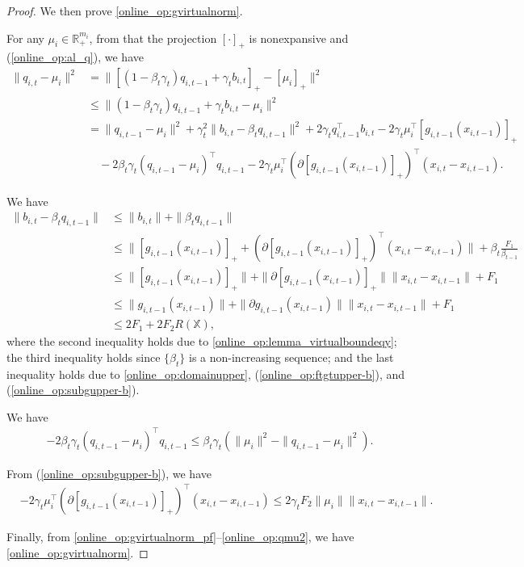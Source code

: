 \documentclass[12pt,draftcls,onecolumn]{IEEEtran}%
\begin{document}
\begin{proof}
We then prove \eqref{online_op:gvirtualnorm}.

For any $\mu_i\in\mathbb{R}^{m_i}_+$, from that the projection $[\cdot]_+$ is nonexpansive and (\ref{online_op:al_q}), we have
\begin{align}
\|q_{i,t}-\mu_i\|^2
&=\|[(1-\beta_t\gamma_t)q_{i,t-1}+\gamma_tb_{i,t}]_+-[\mu_i]_+\|^2\nonumber\\
&\le\|(1-\beta_t\gamma_t)q_{i,t-1}+\gamma_tb_{i,t}-\mu_i\|^2\nonumber\\
&=\|q_{i,t-1}-\mu_i\|^2+\gamma_t^2\|b_{i,t}-\beta_tq_{i,t-1}\|^2
+2\gamma_tq_{i,t-1}^\top b_{i,t}-2\gamma_t\mu_i^\top [g_{i,t-1}(x_{i,t-1})]_+\nonumber\\
&\quad
-2\beta_t\gamma_t(q_{i,t-1}-\mu_i)^\top q_{i,t-1}
-2\gamma_t\mu_i^\top(\partial [g_{i,t-1}(x_{i,t-1})]_+)^\top(x_{i,t}-x_{i,t-1}).
\label{online_op:gvirtualnorm_pf}
\end{align}

We have
\begin{align}\label{online_op:gvirtualnorm_pf2}
\|b_{i,t}-\beta_tq_{i,t-1}\|&\le \|b_{i,t}\|+\|\beta_tq_{i,t-1}\|\nonumber\\
&\le\|[g_{i,t-1}(x_{i,t-1})]_+ +(\partial [g_{i,t-1}(x_{i,t-1})]_+)^\top(x_{i,t}-x_{i,t-1})\|+\beta_t\frac{F_1}{\beta_{t-1}}\nonumber\\
&\le\|[g_{i,t-1}(x_{i,t-1})]_+\|+\|\partial [g_{i,t-1}(x_{i,t-1})]_+\|\|x_{i,t}-x_{i,t-1}\|+F_1\nonumber\\
&\le\|g_{i,t-1}(x_{i,t-1})\|
+\|\partial g_{i,t-1}(x_{i,t-1})\|\|x_{i,t}-x_{i,t-1}\|+F_1\nonumber\\
&\le 2F_1+2F_2R(\mathbb{X}),
\end{align}
where the second inequality holds due to \eqref{online_op:lemma_virtualboundeqy}; the third inequality holds since $\{\beta_t\}$ is a non-increasing sequence; and the last inequality holds due to \eqref{online_op:domainupper}, (\ref{online_op:ftgtupper-b}), and (\ref{online_op:subgupper-b}).

We have
\begin{align}
-2\beta_t\gamma_t(q_{i,t-1}-\mu_i)^\top q_{i,t-1}
\le\beta_t\gamma_t(\|\mu_i\|^2-\|q_{i,t-1}-\mu_i\|^2).\label{online_op:qmu3}
\end{align}

From (\ref{online_op:subgupper-b}), we have
\begin{align}
&-2\gamma_t\mu_i^\top(\partial [g_{i,t-1}(x_{i,t-1})]_+)^\top(x_{i,t}-x_{i,t-1})\le2\gamma_tF_2\|\mu_i\|\|x_{i,t}-x_{i,t-1}\|.\label{online_op:qmu2}
\end{align}

Finally, from \eqref{online_op:gvirtualnorm_pf}--\eqref{online_op:qmu2}, we have \eqref{online_op:gvirtualnorm}.
\end{proof}
\end{document}

